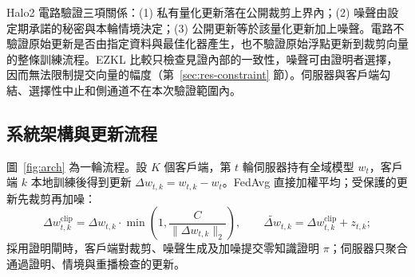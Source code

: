 \documentclass[12pt,a4paper]{article}
\begin{document}
Halo2 電路驗證三項關係：(1) 私有量化更新落在公開裁剪上界內；(2) 噪聲由設定期承諾的秘密與本輪情境決定；(3) 公開更新等於該量化更新加上噪聲。電路不驗證原始更新是否由指定資料與最佳化器產生，也不驗證原始浮點更新到裁剪向量的整條訓練流程。EZKL 比較只檢查見證內部的一致性，噪聲可由證明者選擇，因而無法限制提交向量的幅度（第~\ref{sec:res-constraint} 節）。伺服器與客戶端勾結、選擇性中止和側通道不在本次驗證範圍內。

\subsection{系統架構與更新流程}
圖~\ref{fig:arch} 為一輪流程。設 $K$ 個客戶端，第 $t$ 輪伺服器持有全域模型 $w_t$，客戶端 $k$ 本地訓練後得到更新 $\Delta w_{t,k}=w_{t,k}-w_t$。FedAvg 直接加權平均；受保護的更新先裁剪再加噪：
\begin{equation}
\Delta w^{\mathrm{clip}}_{t,k}=\Delta w_{t,k}\cdot\min\!\left(1,\frac{C}{\lVert\Delta w_{t,k}\rVert_2}\right),\qquad
\widetilde{\Delta w}_{t,k}=\Delta w^{\mathrm{clip}}_{t,k}+z_{t,k};
\end{equation}
採用證明閘時，客戶端對裁剪、噪聲生成及加噪提交零知識證明 $\pi$；伺服器只聚合通過證明、情境與重播檢查的更新。
\end{document}
